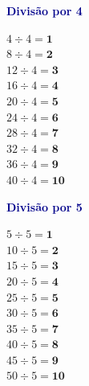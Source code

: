 \documentclass[12pt]{article}
\begin{document}
\begin{minipage}[t]{3.3cm}
\noindent\textcolor{darkblue}{\bfseries\small Divisão por 4}\par\vspace{2pt}
{\footnotesize
$4\div4=\mathbf{1}$\\$8\div4=\mathbf{2}$\\$12\div4=\mathbf{3}$\\
$16\div4=\mathbf{4}$\\$20\div4=\mathbf{5}$\\$24\div4=\mathbf{6}$\\
$28\div4=\mathbf{7}$\\$32\div4=\mathbf{8}$\\$36\div4=\mathbf{9}$\\
$40\div4=\mathbf{10}$}
\end{minipage}\hfill
\begin{minipage}[t]{3.3cm}
\noindent\textcolor{darkblue}{\bfseries\small Divisão por 5}\par\vspace{2pt}
{\footnotesize
$5\div5=\mathbf{1}$\\$10\div5=\mathbf{2}$\\$15\div5=\mathbf{3}$\\
$20\div5=\mathbf{4}$\\$25\div5=\mathbf{5}$\\$30\div5=\mathbf{6}$\\
$35\div5=\mathbf{7}$\\$40\div5=\mathbf{8}$\\$45\div5=\mathbf{9}$\\
$50\div5=\mathbf{10}$}
\end{minipage}
\end{document}
